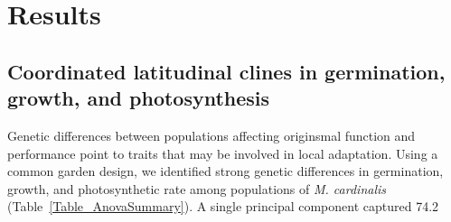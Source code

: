 \documentclass[11pt, oneside]{article}\usepackage[]{graphicx}\usepackage[]{color}
\begin{document}

\section*{Results}

\subsection*{Coordinated latitudinal clines in germination, growth, and photosynthesis}

Genetic differences between populations affecting originsmal function and performance point to traits that may be involved in local adaptation. Using a common garden design, we identified strong genetic differences in germination, growth, and photosynthetic rate among populations of \textit{M. cardinalis} (Table~\ref{Table_AnovaSummary}). A single principal component captured 74.2 %

\end{document}
